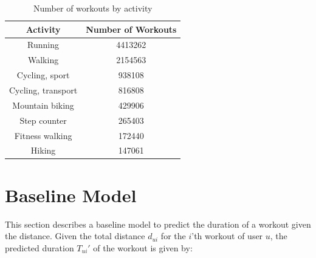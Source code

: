 \documentclass{acm_proc_article-sp}
\begin{document}
\begin{table}[h]
\centering
\begin{tabular}{|c|c|} \hline
\bf{Activity} & \bf{Number of Workouts}  \\ \hline
Running  &           4413262 \\ \hline
Walking  &           2154563 \\ \hline
Cycling, sport  &     938108 \\ \hline
Cycling, transport & 816808 \\ \hline
Mountain biking  &   429906 \\ \hline
Step counter     &   265403 \\ \hline
Fitness walking   &  172440 \\ \hline
Hiking &   147061 \\ \hline
\end{tabular}
\caption{Number of workouts by activity}
\label{tableStatsByActivity}
\end{table}

\section{Baseline Model}
\label{secBaselineModel}
This section describes a baseline model to predict the duration of a workout given the distance. Given the total distance $d_{ui}$ for the $i$'th workout of user $u$, the predicted duration $T_{ui}'$ of the workout is given by:
\end{document}
